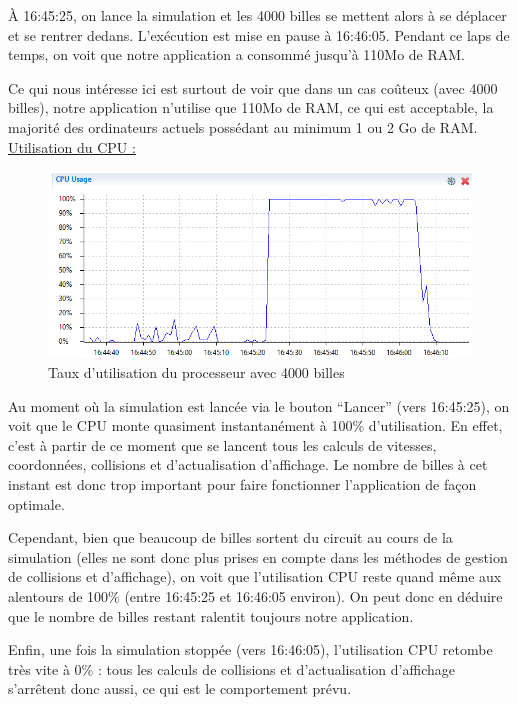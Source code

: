 \documentclass{report}
\begin{document}
À 16:45:25, on lance la simulation et les 4000 billes se mettent alors à se déplacer et se rentrer dedans. L’exécution est mise en pause à 16:46:05.
Pendant ce laps de temps, on voit que notre application a consommé jusqu’à 110Mo de RAM. 
    
Ce qui nous intéresse ici est surtout de voir que dans un cas coûteux (avec 4000 billes), notre application n’utilise que 110Mo de RAM, ce qui est acceptable, la majorité des ordinateurs actuels possédant au minimum 1 ou 2 Go de RAM. \\

\newpage
\underline{Utilisation du CPU :}

\begin{figure}[H]
\centering
\includegraphics[scale=0.9]{timeline_cpu.png}
\caption{Taux d'utilisation du processeur avec 4000 billes}
\end{figure}

Au moment où la simulation est lancée via le bouton “Lancer” (vers 16:45:25), on voit que le CPU monte quasiment instantanément à 100\% d’utilisation. En effet, c’est à partir de ce moment que se lancent tous les calculs de vitesses, coordonnées, collisions et d’actualisation d’affichage. Le nombre de billes à cet instant est donc trop important pour faire fonctionner l’application de façon optimale.

Cependant, bien que beaucoup de billes sortent du circuit au cours de la simulation (elles ne sont donc plus prises en compte dans les méthodes de gestion de collisions et d’affichage), on voit que l’utilisation CPU reste quand même aux alentours de 100\% (entre 16:45:25 et 16:46:05 environ). On peut donc en déduire que le nombre de billes restant ralentit toujours notre application.

Enfin, une fois la simulation stoppée (vers 16:46:05), l’utilisation CPU retombe très vite à 0\% : tous les calculs de collisions et d’actualisation d’affichage s’arrêtent donc aussi, ce qui est le comportement prévu.
\end{document}
